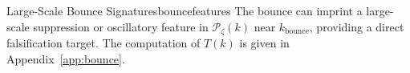 \begin{corollary}{Large-Scale Bounce Signatures}{bouncefeatures}
The bounce can imprint a large-scale suppression or oscillatory feature in
$\mathcal{P}_\zeta(k)$ near $k_{\text{bounce}}$, providing a direct falsification
target. The computation of $T(k)$ is given in Appendix~\ref{app:bounce}.
\end{corollary}

